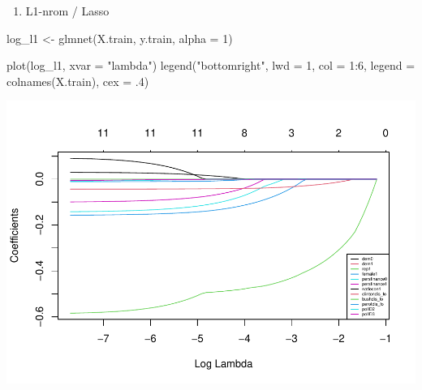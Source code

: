 \documentclass[
]{article}
\newenvironment{Shaded}{\begin{snugshade}}{\end{snugshade}}
\newcommand{\AttributeTok}[1]{\textcolor[rgb]{0.77,0.63,0.00}{#1}}
\newcommand{\DecValTok}[1]{\textcolor[rgb]{0.00,0.00,0.81}{#1}}
\newcommand{\FunctionTok}[1]{\textcolor[rgb]{0.00,0.00,0.00}{#1}}
\newcommand{\NormalTok}[1]{#1}
\newcommand{\OtherTok}[1]{\textcolor[rgb]{0.56,0.35,0.01}{#1}}
\newcommand{\SpecialCharTok}[1]{\textcolor[rgb]{0.00,0.00,0.00}{#1}}
\newcommand{\StringTok}[1]{\textcolor[rgb]{0.31,0.60,0.02}{#1}}
\providecommand{\tightlist}{%
  \setlength{\itemsep}{0pt}\setlength{\parskip}{0pt}}
\begin{document}
\begin{enumerate}
\def\labelenumi{\arabic{enumi}.}
\tightlist
\item
  L1-nrom / Lasso
\end{enumerate}

\begin{Shaded}
\begin{Highlighting}[]
\NormalTok{log\_l1 }\OtherTok{\textless{}{-}} \FunctionTok{glmnet}\NormalTok{(X.train, y.train, }\AttributeTok{alpha =} \DecValTok{1}\NormalTok{)}

\FunctionTok{plot}\NormalTok{(log\_l1, }\AttributeTok{xvar =} \StringTok{"lambda"}\NormalTok{)}
\FunctionTok{legend}\NormalTok{(}\StringTok{"bottomright"}\NormalTok{, }\AttributeTok{lwd =} \DecValTok{1}\NormalTok{, }\AttributeTok{col =} \DecValTok{1}\SpecialCharTok{:}\DecValTok{6}\NormalTok{, }\AttributeTok{legend =} \FunctionTok{colnames}\NormalTok{(X.train), }\AttributeTok{cex =}\NormalTok{ .}\DecValTok{4}\NormalTok{)}
\end{Highlighting}
\end{Shaded}

\includegraphics{1992-US-election_files/figure-latex/unnamed-chunk-11-1.pdf}

\begin{Shaded}
\end{Shaded}
\end{document}
